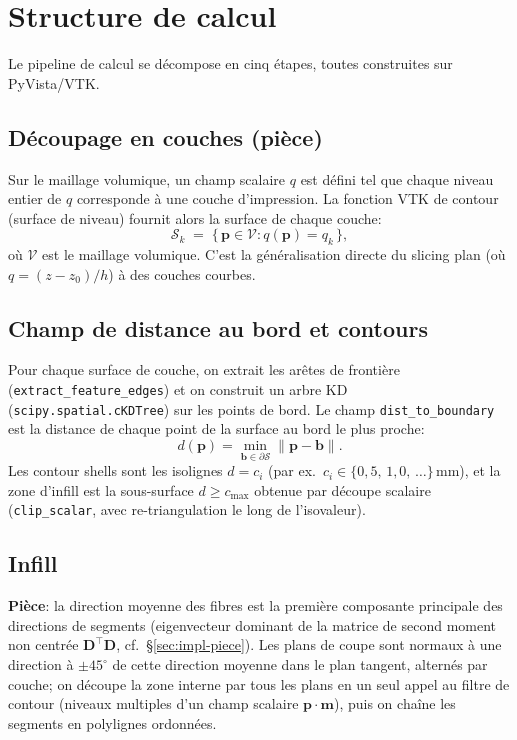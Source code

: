 \documentclass[11pt,a4paper]{article}
\begin{document}
\section{Structure de calcul}\label{sec:structure}

Le pipeline de calcul se décompose en cinq étapes, toutes construites
sur PyVista/VTK.

\subsection{Découpage en couches (pièce)}
Sur le maillage volumique, un champ scalaire $q$ est défini tel que
chaque niveau entier de $q$ corresponde à une couche d'impression. La
fonction VTK de contour (surface de niveau) fournit alors la surface
de chaque couche:
\begin{equation}
  \mathcal{S}_k \;=\; \{\, \mathbf{p} \in \mathcal{V} : q(\mathbf{p}) = q_k \,\},
\end{equation}
où $\mathcal{V}$ est le maillage volumique. C'est la généralisation
directe du slicing plan (où $q = (z - z_0)/h$) à des couches courbes.

\subsection{Champ de distance au bord et contours}
Pour chaque surface de couche, on extrait les arêtes de frontière
(\texttt{extract\_feature\_edges}) et on construit un arbre KD
(\texttt{scipy.spatial.cKDTree}) sur les points de bord. Le champ
\texttt{dist\_to\_boundary} est la distance de chaque point de la
surface au bord le plus proche:
\begin{equation}
  d(\mathbf{p}) = \min_{\mathbf{b} \in \partial\mathcal{S}} \|\mathbf{p}-\mathbf{b}\|.
\end{equation}
Les contour shells sont les isolignes $d = c_i$ (par ex.\
$c_i \in \{0{,}5,\,1{,}0,\,\dots\}$\,mm), et la zone d'infill est la
sous-surface $d \ge c_{\max}$ obtenue par découpe scalaire
(\texttt{clip\_scalar}, avec re-triangulation le long de l'isovaleur).

\subsection{Infill}
\textbf{Pièce}: la direction moyenne des fibres est la première
composante principale des directions de segments (eigenvecteur
dominant de la matrice de second moment non centrée
$\mathbf{D}^\top\mathbf{D}$, cf.\ \S\ref{sec:impl-piece}). Les plans de
coupe sont normaux à une direction à $\pm45^\circ$ de cette direction
moyenne dans le plan tangent, alternés par couche; on découpe la zone
interne par tous les plans en un seul appel au filtre de contour
(niveaux multiples d'un champ scalaire $\mathbf{p}\cdot\mathbf{m}$),
puis on chaîne les segments en polylignes ordonnées.
\end{document}
